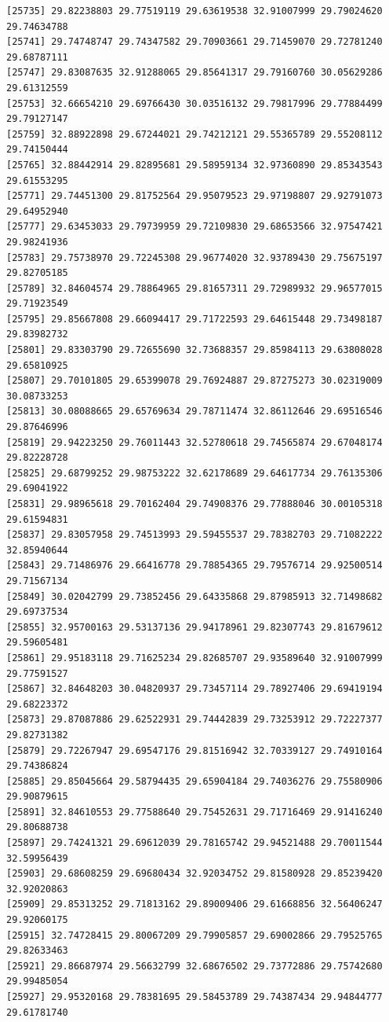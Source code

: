 \documentclass[
  letterpaper,
  DIV=11,
  numbers=noendperiod]{scrartcl}
\begin{document}
\begin{verbatim}
[25735] 29.82238803 29.77519119 29.63619538 32.91007999 29.79024620 29.74634788
[25741] 29.74748747 29.74347582 29.70903661 29.71459070 29.72781240 29.68787111
[25747] 29.83087635 32.91288065 29.85641317 29.79160760 30.05629286 29.61312559
[25753] 32.66654210 29.69766430 30.03516132 29.79817996 29.77884499 29.79127147
[25759] 32.88922898 29.67244021 29.74212121 29.55365789 29.55208112 29.74150444
[25765] 32.88442914 29.82895681 29.58959134 32.97360890 29.85343543 29.61553295
[25771] 29.74451300 29.81752564 29.95079523 29.97198807 29.92791073 29.64952940
[25777] 29.63453033 29.79739959 29.72109830 29.68653566 32.97547421 29.98241936
[25783] 29.75738970 29.72245308 29.96774020 32.93789430 29.75675197 29.82705185
[25789] 32.84604574 29.78864965 29.81657311 29.72989932 29.96577015 29.71923549
[25795] 29.85667808 29.66094417 29.71722593 29.64615448 29.73498187 29.83982732
[25801] 29.83303790 29.72655690 32.73688357 29.85984113 29.63808028 29.65810925
[25807] 29.70101805 29.65399078 29.76924887 29.87275273 30.02319009 30.08733253
[25813] 30.08088665 29.65769634 29.78711474 32.86112646 29.69516546 29.87646996
[25819] 29.94223250 29.76011443 32.52780618 29.74565874 29.67048174 29.82228728
[25825] 29.68799252 29.98753222 32.62178689 29.64617734 29.76135306 29.69041922
[25831] 29.98965618 29.70162404 29.74908376 29.77888046 30.00105318 29.61594831
[25837] 29.83057958 29.74513993 29.59455537 29.78382703 29.71082222 32.85940644
[25843] 29.71486976 29.66416778 29.78854365 29.79576714 29.92500514 29.71567134
[25849] 30.02042799 29.73852456 29.64335868 29.87985913 32.71498682 29.69737534
[25855] 32.95700163 29.53137136 29.94178961 29.82307743 29.81679612 29.59605481
[25861] 29.95183118 29.71625234 29.82685707 29.93589640 32.91007999 29.77591527
[25867] 32.84648203 30.04820937 29.73457114 29.78927406 29.69419194 29.68223372
[25873] 29.87087886 29.62522931 29.74442839 29.73253912 29.72227377 29.82731382
[25879] 29.72267947 29.69547176 29.81516942 32.70339127 29.74910164 29.74386824
[25885] 29.85045664 29.58794435 29.65904184 29.74036276 29.75580906 29.90879615
[25891] 32.84610553 29.77588640 29.75452631 29.71716469 29.91416240 29.80688738
[25897] 29.74241321 29.69612039 29.78165742 29.94521488 29.70011544 32.59956439
[25903] 29.68608259 29.69680434 32.92034752 29.81580928 29.85239420 32.92020863
[25909] 29.85313252 29.71813162 29.89009406 29.61668856 32.56406247 29.92060175
[25915] 32.74728415 29.80067209 29.79905857 29.69002866 29.79525765 29.82633463
[25921] 29.86687974 29.56632799 32.68676502 29.73772886 29.75742680 29.99485054
[25927] 29.95320168 29.78381695 29.58453789 29.74387434 29.94844777 29.61781740

\end{verbatim}
\end{document}
